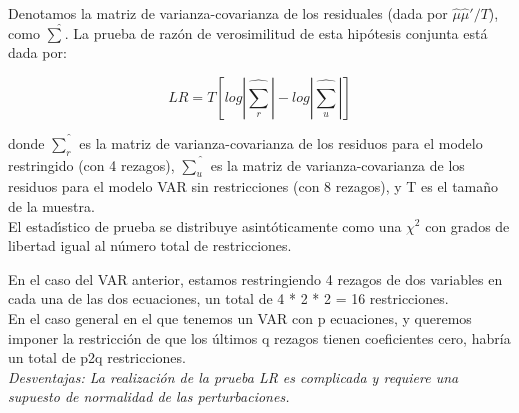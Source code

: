	Denotamos la matriz de varianza-covarianza de los residuales (dada por $\hat{\mu}\hat{\mu}' /T$), como $\hat{\sum}$. La prueba de raz\'on de verosimilitud de esta hip\'otesis conjunta está dada por:
	
	\begin{equation*}
	LR = T\left [ log |\hat{\sum_r}| - log |\hat{\sum_u}| \right ]
	\end{equation*}
	
	donde $\hat{\sum_r}$ es la matriz de varianza-covarianza de los residuos para el modelo restringido (con 4 rezagos), $\hat{\sum_u}$ es la matriz de varianza-covarianza de los residuos para el modelo VAR sin restricciones (con 8 rezagos), y T es el tama\~no de la muestra.\\
	El estad\'{\i}stico de prueba se distribuye asint\'oticamente como una $\chi^2$ con grados de libertad igual al n\'umero total de restricciones. 
	
	
	En el caso del VAR anterior, estamos restringiendo 4 rezagos de dos variables en cada una de las dos ecuaciones, un total de 4 * 2 * 2 = 16 restricciones.\\
	En el caso general en el que tenemos un VAR con p ecuaciones, y queremos imponer la restricci\'on de que los \'ultimos q rezagos tienen coeficientes cero,  habría un total de p2q restricciones.\\
	\textit{Desventajas: La realizaci\'on de la prueba LR es complicada y requiere una supuesto de normalidad de las perturbaciones.}
	
	
